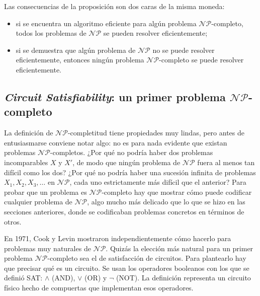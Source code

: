\documentclass[12pt, spanish, oneside, openany]{book}
\newcommand{\NP}{\mathcal{NP}}
\newcommand{\prob}[1]{\textit{#1}}
\theoremstyle{uprightplain}
\theoremstyle{definition}
\theoremstyle{remark}
\theoremstyle{definition}
\begin{document}
Las consecuencias de la proposición son dos caras de la misma moneda:
\begin{itemize}
    \item si se encuentra un algoritmo eficiente para algún problema $\NP$-completo, todos los problemas de $\NP$ se pueden resolver eficientemente;
    \item si se demuestra que algún problema de $\NP$ no se puede resolver eficientemente, entonces ningún problema $\NP$-completo se puede resolver eficientemente.
\end{itemize}

\subsection{\texorpdfstring{\prob{Circuit Satisfiability}: un primer problema $\NP$-completo}{Circuit Satisfiability: un primer problema NP-completo}}
\label{subsec:np-csat}

La definición de $\NP$-completitud tiene propiedades muy lindas, pero antes de entusiasmarse conviene notar algo: no es para nada evidente que existan problemas $\NP$-completos. ¿Por qué no podría haber dos problemas incomparables $X$ y $X'$, de modo que ningún problema de $\NP$ fuera al menos tan difícil como los dos? ¿Por qué no podría haber una sucesión infinita de problemas $X_1,X_2,X_3,\dots$ en $\NP$, cada uno estrictamente más difícil que el anterior? Para probar que un problema es $\NP$-completo hay que mostrar cómo puede codificar cualquier problema de $\NP$, algo mucho más delicado que lo que se hizo en las secciones anteriores, donde se codificaban problemas concretos en términos de otros.

En 1971, Cook y Levin mostraron independientemente cómo hacerlo para problemas muy naturales de $\NP$. Quizás la elección más natural para un primer problema $\NP$-completo sea el de satisfacción de circuitos. Para plantearlo hay que precisar qué es un circuito. Se usan los operadores booleanos con los que se definió SAT: $\wedge$ (AND), $\vee$ (OR) y $\neg$ (NOT). La definición representa un circuito físico hecho de compuertas que implementan esos operadores.
\end{document}

